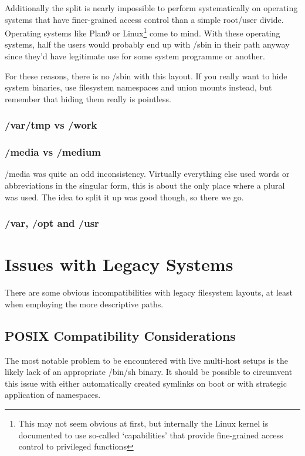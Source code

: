 \documentclass[a4paper,twoside,titlepage]{article}
\begin{document}
Additionally the split is nearly impossible to perform systematically on
operating systems that have finer-grained access control than a simple root/user
divide. Operating systems like Plan9 or Linux\footnote{This may not seem obvious
at first, but internally the Linux kernel is documented to use so-called
`capabilities' that provide fine-grained access control to privileged functions}
come to mind. With these operating systems, half the users would probably end up
with /sbin in their path anyway since they'd have legitimate use for some system
programme or another.

For these reasons, there is no /sbin with this layout. If you really want to
hide system binaries, use filesystem namespaces and union mounts instead, but
remember that hiding them really is pointless.

\subsubsection{/var/tmp vs /work}

\subsubsection{/media vs /medium}
/media was quite an odd inconsistency. Virtually everything else used words or
abbreviations in the singular form, this is about the only place where a plural
was used. The idea to split it up was good though, so there we go.

\subsubsection{/var, /opt and /usr}

\newpage

\section{Issues with Legacy Systems}
There are some obvious incompatibilities with legacy filesystem layouts, at
least when employing the more descriptive paths.

\subsection{POSIX Compatibility Considerations}
The most notable problem to be encountered with live multi-host setups is the
likely lack of an appropriate /bin/sh binary. It should be possible to
circumvent this issue with either automatically created symlinks on boot or
with strategic application of namespaces.
\end{document}
